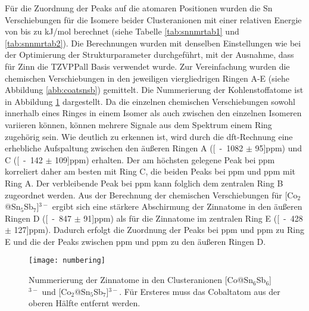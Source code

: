 Für die Zuordnung der Peaks auf die atomaren Positionen wurden die Sn Verschiebungen für die Isomere beider Clusteranionen mit einer relativen Energie von bis zu \unit[10]{kJ/mol} berechnet (siehe Tabelle \ref{tab:snnmrtab1} und \ref{tab:snnmrtab2}). Die Berechnungen wurden mit denselben Einstellungen wie bei der Optimierung der Strukturparameter durchgeführt, mit der Ausnahme, dass für Zinn die TZVPPall Basis\supercite{ahlrichs2000contracted} verwendet wurde. Zur Vereinfachung wurden die chemischen Verschiebungen in den jeweiligen viergliedrigen Ringen A-E (siehe Abbildung \ref{abb:coatsnsb}) gemittelt. Die Nummerierung der Kohlenstoffatome ist in Abbildung \ref{abb:numbering} dargestellt.  Da die einzelnen chemischen Verschiebungen sowohl innerhalb eines Ringes in einem Isomer als auch zwischen den einzelnen Isomeren variieren können, können mehrere Signale aus dem Spektrum einem Ring zugehörig sein. Wie deutlich zu erkennen ist, wird durch die \ac{dft}-Rechnung eine erhebliche Aufspaltung zwischen den äußeren Ringen A (\unit[-1082 $\pm$ 95]{ppm}) und C (\unit[-142 $\pm$ 109]{ppm}) erhalten. Der am höchsten gelegene Peak bei \unit[-119]{ppm} korreliert daher am besten mit Ring C, die beiden Peaks bei \unit[-970]{ppm} und \unit[-1018]{ppm} mit Ring A. Der verbleibende Peak bei \unit[-731]{ppm} kann folglich dem zentralen Ring B zugeordnet werden. Aus der Berechnung der chemischen Verschiebungen für [Co$_2$@Sn$_5$Sb$_7$]$^{3-}$ ergibt sich eine stärkere Abschirmung der Zinnatome in den äußeren Ringen D (\unit[-847 $\pm$ 91]{ppm}) als für die Zinnatome im zentralen Ring E (\unit[-428 $\pm$ 127]{ppm}). Dadurch erfolgt die Zuordnung der Peaks bei \unit[-634]{ppm} und \unit[-676]{ppm} zu Ring E und die der Peaks zwischen \unit[-849]{ppm} und \unit[-890]{ppm} zu den äußeren Ringen D. 
\vspace{20pt}
\begin{figure}[ht!]
	\centering
	\texttt{[image: numbering]}
	\captionsetup{figurewithin = chapter}
	\captionsetup{font=small, labelfont=bf}\caption[Nummerierung der Zinnatome in {[Co@Sn$_6$Sb$_6$]$^{3-}$} und {[Co$_2$@Sn$_5$Sb$_7$]$^{3-}$} ]{Nummerierung der Zinnatome in den Clusteranionen [Co@Sn$_6$Sb$_6$]$^{3-}$ und [Co$_2$@Sn$_5$Sb$_7$]$^{3-}$. Für Ersteres muss das Cobaltatom aus der oberen Hälfte entfernt werden.}
\label{abb:numbering}
\end{figure}
\vfill
\newpage

